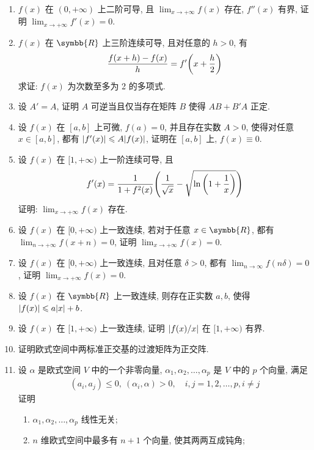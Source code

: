 \documentclass{ctexart}
\let\le\leqslant
\newcommand{\limit}[2]{\lim_{#1 \to #2}}
\newcommand{\R}{\ensuremath{\symbb{R}}}
\begin{document}
\begin{enumerate}[series=exer]
    \item $ f(x) $ 在 $ (0, +\infty) $ 上二阶可导, 且 $ \limit{x}{+\infty} f(x) $ 存在, $ f''(x) $ 有界, 证明 $ \limit{x}{+\infty} f'(x) = 0 $.
    \item $ f(x) $ 在 $ \R $ 上三阶连续可导, 且对任意的 $ h > 0 $, 有
    \begin{align*}
        \frac{f(x + h) - f(x)}{h} = f'\qty(x + \frac{h}{2})
    \end{align*}
    求证: $ f(x) $ 为次数至多为 2 的多项式.
    \item 设 $ A' = A $, 证明 $ A $ 可逆当且仅当存在矩阵 $ B $ 使得 $ AB + B'A $ 正定.
    \item 设 $ f(x) $ 在 $ [a, b] $ 上可微, $ f(a) = 0 $, 并且存在实数 $ A > 0 $, 使得对任意 $ x \in [a, b] $, 都有 $ \abs{f'(x)} \le A \abs{f(x)} $, 证明在 $ [a, b] $ 上, $ f(x) \equiv 0 $. 
    \item 设 $ f(x) $ 在 $ [1, +\infty) $ 上一阶连续可导, 且
    \begin{align*}
        f'(x) = \frac{1}{1 + f^{2}(x)}\qty(\frac{1}{\sqrt{x}} - \sqrt{\ln\qty(1 + \frac{1}{x})})
    \end{align*}
    证明: $ \limit{x}{+\infty}f(x) $ 存在.
    \item 设 $ f(x) $ 在 $ [0, +\infty) $ 上一致连续, 若对于任意 $ x \in \R $, 都有 $ \limit{n}{+\infty} f(x + n) = 0 $, 证明 $ \limit{x}{+\infty} f(x) = 0 $.  
    \item 设 $ f(x) $ 在 $ [0, +\infty) $ 上一致连续, 且对任意 $ \delta > 0 $, 都有 $ \limit{n}{\infty} f(n\delta) = 0 $, 证明 $ \limit{x}{+\infty} f(x) = 0 $.  
    \item 设 $ f(x) $ 在 $ \R $ 上一致连续, 则存在正实数 $ a, b $, 使得 $ \abs{f(x)} \le a\abs{x} + b $. 
    \item 设 $ f(x) $ 在 $ [1, +\infty) $ 上一致连续, 证明 $ \abs{f(x)/x} $ 在 $ [1, +\infty) $ 有界. 
    \item 证明欧式空间中两标准正交基的过渡矩阵为正交阵.
    \item 设 $ \alpha $ 是欧式空间 $ V $ 中的一个非零向量, $ \alpha_{1}, \alpha_{2}, \dots, \alpha_{p} $ 是 $ V $ 中的 $ p $ 个向量, 满足
    \begin{align*}
        (a_{i}, a_{j}) \le 0,\ (\alpha_{i}, \alpha) > 0, \quad i, j = 1, 2, \dots, p, i \ne j
    \end{align*}
    证明
    \begin{enumerate}
        \item $ \alpha_{1}, \alpha_{2}, \dots, \alpha_{p} $ 线性无关;
        \item $ n $ 维欧式空间中最多有 $ n + 1 $ 个向量, 使其两两互成钝角;

\end{enumerate}
\end{enumerate}
\end{document}
